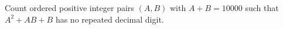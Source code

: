 Count ordered positive integer pairs $(A,B)$ with $A+B=10000$ such that $A^2+AB+B$ has no repeated decimal digit.
